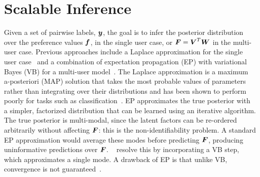 \section{Scalable Inference}\label{sec:inf}

Given a set of pairwise labels, $\boldsymbol y$, 
the goal is to infer the posterior distribution over the preference values $\boldsymbol f$, in the single
user case, or $\boldsymbol F=\boldsymbol V^T \boldsymbol W$ in the multi-user case. 
Previous approaches include a Laplace approximation for the single user case~\citep{chu2005preference}
and a combination of expectation propagation (EP) with variational Bayes (VB) for a 
multi-user model~\citep{houlsby2012collaborative}.
The Laplace approximation is a maximum a-posteriori (MAP) solution that
takes the most probable values of parameters rather than integrating over their distributions
and has been shown to perform poorly for tasks such as classification~\citep{nickisch2008approximations}. 
EP approximates the true posterior with a simpler, factorized distribution
that can be learned using an iterative algorithm.
The true posterior is multi-modal, since the latent factors can be re-ordered arbitrarily without
affecting $\boldsymbol F$: this is the non-identifiability problem.
A standard EP approximation would average these modes before predicting $\boldsymbol F$,
producing uninformative predictions over $\boldsymbol F$.
~\citet{houlsby2012collaborative} resolve this by incorporating a VB step, which approximates a single mode.
A drawback of EP is that unlike VB, convergence is not guaranteed~\citep{minka2001expectation}.

